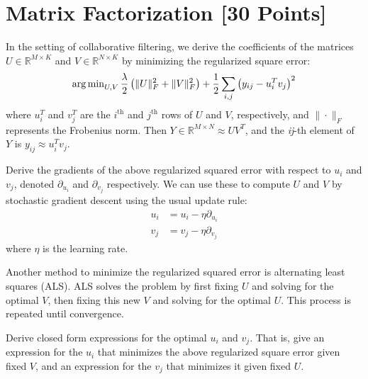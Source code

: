 \begin{solution}

\end{solution}


\newpage
\section{Matrix Factorization [30 Points]}

In the setting of collaborative filtering, we derive the coefficients of the matrices $U \in \mathbb{R}^{M \times K}$ and $V \in \mathbb{R}^{N \times K}$ by minimizing the regularized square error:
$$\operatorname{arg\,min}_{U,V} \frac{\lambda}{2} \left( \|U\|_F^2 + \|V\|^2_F \right) + \frac{1}{2}\sum_{i,j} \left( y_{ij} - u_i^Tv_j\right)^2$$
where $u_i^T$ and $v_j^T$ are the $i^{\text{th}}$ and $j^{\text{th}}$ rows of $U$ and $V$, respectively, and $\|\cdot\|_F$ represents the Frobenius norm. Then $Y \in \mathbb{R}^{M \times N} \approx UV^T$, and the \textit{ij}-th element of $Y$ is $y_{ij} \approx u_i^Tv_j$.

\problem[5]
Derive the gradients of the above regularized squared error with respect to $u_i$ and $v_j$, denoted $\partial_{u_i}$ and $\partial_{v_j}$ respectively.  We can use these to compute $U$ and $V$ by stochastic gradient descent using the usual update rule: 
\begin{align*}
u_i &= u_i - \eta \partial_{u_i} \\
v_j &= v_j - \eta \partial_{v_j}
\end{align*}
where $\eta$ is the learning rate.

\begin{solution}

\end{solution}

\problem[5]
Another method to minimize the regularized squared error is alternating least squares (ALS). ALS solves the problem by first fixing $U$ and solving for the optimal $V$, then fixing this new $V$ and solving for the optimal $U$.  This process is repeated until convergence.

Derive closed form expressions for the optimal $u_i$ and $v_j$.  That is, give an expression for the $u_i$ that minimizes the above regularized square error given fixed $V$, and an expression for the $v_j$ that minimizes it given fixed $U$.

\begin{solution}


\end{solution}

